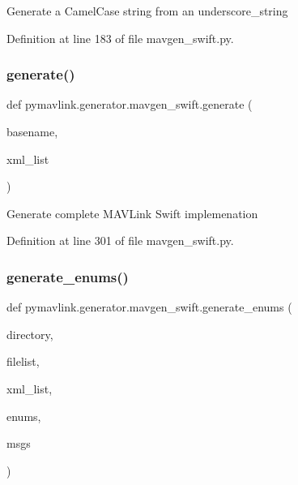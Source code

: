 \begin{DoxyVerb}Generate a CamelCase string from an underscore_string\end{DoxyVerb}
 

Definition at line 183 of file mavgen\+\_\+swift.\+py.

\mbox{\label{namespacepymavlink_1_1generator_1_1mavgen__swift_a0435c038175b5fff7394838ccebd9c64}} 
\subsubsection{\texorpdfstring{generate()}{generate()}}
{\footnotesize\ttfamily def pymavlink.\+generator.\+mavgen\+\_\+swift.\+generate (\begin{DoxyParamCaption}\item[{}]{basename,  }\item[{}]{xml\+\_\+list }\end{DoxyParamCaption})}

\begin{DoxyVerb}Generate complete MAVLink Swift implemenation\end{DoxyVerb}
 

Definition at line 301 of file mavgen\+\_\+swift.\+py.

\mbox{\label{namespacepymavlink_1_1generator_1_1mavgen__swift_a5603cdc6a0d7d2a8610a00132cc8cce5}} 
\subsubsection{\texorpdfstring{generate\_enums()}{generate\_enums()}}
{\footnotesize\ttfamily def pymavlink.\+generator.\+mavgen\+\_\+swift.\+generate\+\_\+enums (\begin{DoxyParamCaption}\item[{}]{directory,  }\item[{}]{filelist,  }\item[{}]{xml\+\_\+list,  }\item[{}]{enums,  }\item[{}]{msgs }\end{DoxyParamCaption})}

